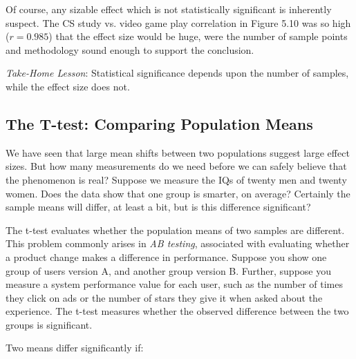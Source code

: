 \documentclass[10pt]{article}
\begin{document}
Of course, any sizable effect which is not statistically significant is inherently suspect. The CS study vs. video game play correlation in Figure 5.10 was so high ($r=0.985$) that the effect size would be huge, were the number of sample points and methodology sound enough to support the conclusion.

\textit{Take-Home Lesson}: Statistical significance depends upon the number of samples, while the effect size does not.

\subsection{The T-test: Comparing Population Means}
We have seen that large mean shifts between two populations suggest large effect sizes. But how many measurements do we need before we can safely believe that the phenomenon is real? Suppose we measure the IQs of twenty men and twenty women. Does the data show that one group is smarter, on average? Certainly the sample means will differ, at least a bit, but is this difference significant?

The t-test evaluates whether the population means of two samples are different. This problem commonly arises in \textit{AB testing}, associated with evaluating whether a product change makes a difference in performance. Suppose you show one group of users version A, and another group version B. Further, suppose you measure a system performance value for each user, such as the number of times they click on ads or the number of stars they give it when asked about the experience. The t-test measures whether the observed difference between the two groups is significant.

Two means differ significantly if:
\end{document}
